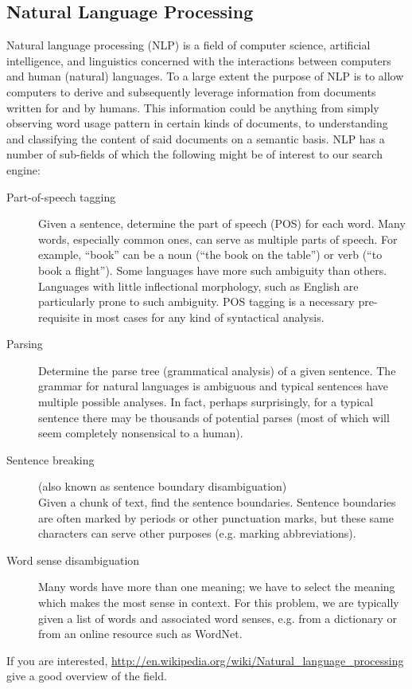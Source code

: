 \documentclass[11pt]{article}
\begin{document}
\subsection{Natural Language Processing}
\label{ssec:nlp}
Natural language processing (NLP) is a field of computer science, artificial intelligence, and linguistics concerned with the interactions between computers and human (natural) languages. To a large extent the purpose of NLP is to allow computers to derive and subsequently leverage information from documents written for and by humans. This information could be anything from simply observing word usage pattern in certain kinds of documents, to understanding and classifying the content of said documents on a semantic basis. NLP has a number of sub-fields of which the following might be of interest to our search engine:
\begin{description}
\item[Part-of-speech tagging] Given a sentence, determine the part of speech (POS) for each word. Many words, especially common ones, can serve as multiple parts of speech. For example, ``book'' can be a noun (``the book on the table'') or verb (``to book a flight''). Some languages have more such ambiguity than others. Languages with little inflectional morphology, such as English are particularly prone to such ambiguity. POS tagging is a necessary pre-requisite in most cases for any kind of syntactical analysis.
\item[Parsing] Determine the parse tree (grammatical analysis) of a given sentence. The grammar for natural languages is ambiguous and typical sentences have multiple possible analyses. In fact, perhaps surprisingly, for a typical sentence there may be thousands of potential parses (most of which will seem completely nonsensical to a human).
\item[Sentence breaking] (also known as sentence boundary disambiguation)\\
Given a chunk of text, find the sentence boundaries. Sentence boundaries are often marked by periods or other punctuation marks, but these same characters can serve other purposes (e.g. marking abbreviations).
\item[Word sense disambiguation]
Many words have more than one meaning; we have to select the meaning which makes the most sense in context. For this problem, we are typically given a list of words and associated word senses, e.g. from a dictionary or from an online resource such as WordNet.
\end{description}
If you are interested, \url{http://en.wikipedia.org/wiki/Natural_language_processing} give a good overview of the field.
\end{document}
